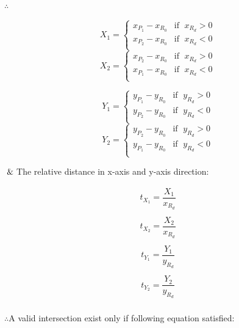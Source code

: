 $\therefore$

\begin{multicols}{2}
\noindent
	\[
	X_1 =
	\begin{cases}
	x_{P_1} - x_{R_0} & \text{if }\;x_{R_d} > 0\\
	x_{P_2} - x_{R_0} & \text{if }\;x_{R_d} < 0\\
	\end{cases}
	\]
\columnbreak
	\[
	X_2 =
	\begin{cases}
	x_{P_2} - x_{R_0} & \text{if }\;x_{R_d} > 0\\
	x_{P_1} - x_{R_0} & \text{if }\;x_{R_d} < 0\\
	\end{cases}
	\]
\end{multicols}

\begin{multicols}{2}
\noindent
	\[
	Y_1 =
	\begin{cases}
	y_{P_1} - y_{R_0} & \text{if }\;y_{R_d} > 0\\
	y_{P_2} - y_{R_0} & \text{if }\;y_{R_d} < 0\\
	\end{cases}
	\]
\columnbreak
	\[
	Y_2 =
	\begin{cases}
	y_{P_2} - y_{R_0} & \text{if }\;y_{R_d} > 0\\
	y_{P_1} - y_{R_0} & \text{if }\;y_{R_d} < 0\\
	\end{cases}
	\]
\end{multicols}

$\And$\;\;\;\;The relative distance in x-axis and y-axis direction:

\begin{multicols}{2}
\noindent
	\[
	\begin{array}{lr}
	t_{X_1} = \dfrac{X_1}{x_{R_d}}\\\\
	t_{X_2} = \dfrac{X_2}{x_{R_d}}\\
	\end{array}
	\]
\columnbreak
	\[
	\begin{array}{lr}
	t_{Y_1} = \dfrac{Y_1}{y_{R_d}}\\\\
	t_{Y_2} = \dfrac{Y_2}{y_{R_d}}\\
	\end{array}
	\]
\end{multicols}

$\therefore$\;\;\;\;A valid intersection exist only if following equation satisfied:

